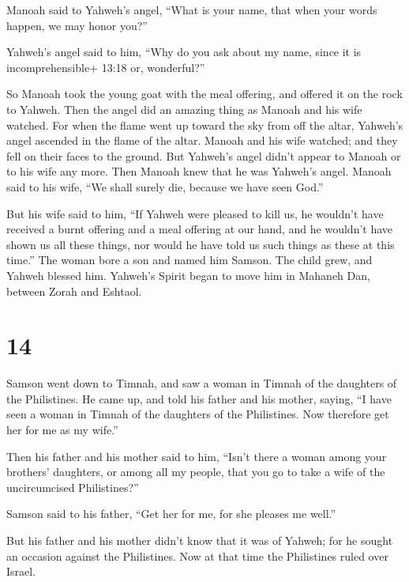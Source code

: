  Manoah said to Yahweh's angel, ``What is your name, that
when your words happen, we may honor you?''

 Yahweh's angel said to him, ``Why do you ask about my
name, since it is incomprehensible+ 13:18 or, wonderful?''

 So Manoah took the young goat with the meal offering, and
offered it on the rock to Yahweh. Then the angel did an amazing thing as
Manoah and his wife watched.  For when the flame went up
toward the sky from off the altar, Yahweh's angel ascended in the flame
of the altar. Manoah and his wife watched; and they fell on their faces
to the ground.  But Yahweh's angel didn't appear to Manoah
or to his wife any more. Then Manoah knew that he was Yahweh's angel.
 Manoah said to his wife, ``We shall surely die, because we
have seen God.''

 But his wife said to him, ``If Yahweh were pleased to kill
us, he wouldn't have received a burnt offering and a meal offering at
our hand, and he wouldn't have shown us all these things, nor would he
have told us such things as these at this time.''  The
woman bore a son and named him Samson. The child grew, and Yahweh
blessed him.  Yahweh's Spirit began to move him in Mahaneh
Dan, between Zorah and Eshtaol.

\hypertarget{section-13}{%
\section{14}\label{section-13}}

 Samson went down to Timnah, and saw a woman in Timnah of
the daughters of the Philistines.  He came up, and told his
father and his mother, saying, ``I have seen a woman in Timnah of the
daughters of the Philistines. Now therefore get her for me as my wife.''

 Then his father and his mother said to him, ``Isn't there a
woman among your brothers' daughters, or among all my people, that you
go to take a wife of the uncircumcised Philistines?''

Samson said to his father, ``Get her for me, for she pleases me well.''

 But his father and his mother didn't know that it was of
Yahweh; for he sought an occasion against the Philistines. Now at that
time the Philistines ruled over Israel.

